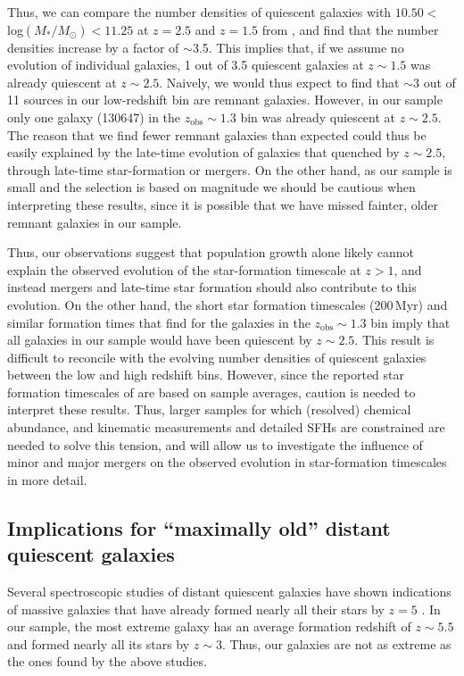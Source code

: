 \documentclass[twocolumn, astrosymb]{aastex631}
\begin{document}
Thus, we can compare the number densities of quiescent galaxies with $10.50 < $ log$(M_*/M_{\odot}) < 11.25$ at $z = 2.5$ and $z = 1.5$ from \citet{DMcLeod2021}, and find that the number densities increase by a factor of $\sim$3.5. This implies that, if we assume no evolution of individual galaxies, 1 out of 3.5 quiescent galaxies at $z\sim1.5$ was already quiescent at $z\sim2.5$. Naively, we would thus expect to find that $\sim$3 out of 11 sources in our low-redshift bin are remnant galaxies. However, in our sample only one galaxy (130647) in the $z_{\text{obs}} \sim 1.3$ bin was already quiescent at $z\sim2.5$. The reason that we find fewer remnant galaxies than expected could thus be easily explained by the late-time evolution of galaxies that quenched by $z\sim2.5$, through late-time star-formation or mergers. On the other hand, as our sample is small and the selection is based on magnitude we should be cautious when interpreting these results, since it is possible that we have missed fainter, older remnant galaxies in our sample. 

Thus, our observations suggest that population growth alone likely cannot explain the observed evolution of the star-formation timescale at $z>1$, and instead mergers and late-time star formation should also contribute to this evolution. On the other hand, the short star formation timescales (200\,Myr) and similar formation times that \citet{ABeverage2024b} find for the galaxies in the $z_{\text{obs}} \sim 1.3$  bin imply that all galaxies in our sample would have been quiescent by $z\sim2.5$. This result is difficult to reconcile with the evolving number densities of quiescent galaxies between the low and high redshift bins. However, since the reported star formation timescales of \citet{ABeverage2024b} are based on sample averages, caution is needed to interpret these results. Thus, larger samples for which (resolved) chemical abundance, and kinematic measurements and detailed SFHs are constrained are needed to solve this tension, and will allow us to investigate the influence of minor and major mergers on the observed evolution in star-formation timescales in more detail.

\subsection{Implications for ``maximally old'' distant quiescent galaxies}
Several spectroscopic studies of distant quiescent galaxies have shown indications of massive galaxies that have already formed nearly all their stars by $z = 5$ \citep[e.g.][]{MKriek2016, BForrest2020b, KGlazebrook2023, ACarnall2023b, DSetton2024, ABeverage2024}. In our sample, the most extreme galaxy has an average formation redshift of $z\sim5.5$ and formed nearly all its stars by $z\sim3$. Thus, our galaxies are not as extreme as the ones found by the above studies. 
\end{document}
